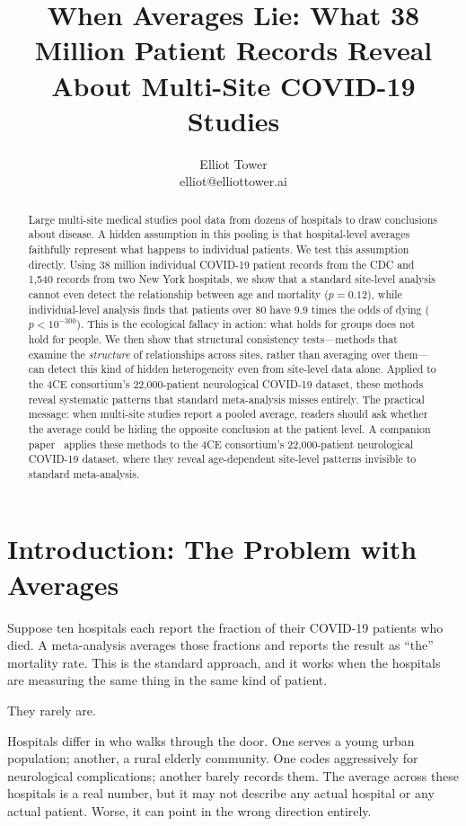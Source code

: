 \documentclass{article}
\title{When Averages Lie: What 38 Million Patient Records Reveal\\About Multi-Site COVID-19 Studies}
\author{\name Elliot Tower \\
      \email elliot@elliottower.ai}
\begin{document}
\maketitle

\begin{abstract}
Large multi-site medical studies pool data from dozens of hospitals to draw
conclusions about disease.  A hidden assumption in this pooling is that
hospital-level averages faithfully represent what happens to individual
patients.  We test this assumption directly.  Using 38 million individual
COVID-19 patient records from the CDC and 1,540 records from two New York
hospitals, we show that a standard site-level analysis cannot even detect the
relationship between age and mortality ($p = 0.12$), while individual-level
analysis finds that patients over 80 have 9.9 times the odds of dying ($p <
10^{-300}$).  This is the ecological fallacy in action: what holds for groups
does not hold for people.  We then show that structural consistency
tests---methods that examine the \emph{structure} of relationships across
sites, rather than averaging over them---can detect this kind of hidden
heterogeneity even from site-level data alone.  Applied to the 4CE
consortium's 22,000-patient neurological COVID-19 dataset, these methods
reveal systematic patterns that standard meta-analysis misses entirely.  The
practical message: when multi-site studies report a pooled average, readers
should ask whether the average could be hiding the opposite conclusion at the
patient level.  A companion paper~\cite{tower2025sitelevel} applies these methods to the 4CE consortium's 22,000-patient neurological COVID-19 dataset, where they reveal age-dependent site-level patterns invisible to standard meta-analysis.
\end{abstract}


\section{Introduction: The Problem with Averages}

Suppose ten hospitals each report the fraction of their COVID-19 patients who
died.  A meta-analysis averages those fractions and reports the result as
``the'' mortality rate.  This is the standard approach, and it works when the
hospitals are measuring the same thing in the same kind of patient.

They rarely are.

Hospitals differ in who walks through the door.  One serves a young urban
population; another, a rural elderly community.  One codes aggressively for
neurological complications; another barely records them.  The average across
these hospitals is a real number, but it may not describe any actual hospital
or any actual patient.  Worse, it can point in the wrong direction entirely.
\end{document}
